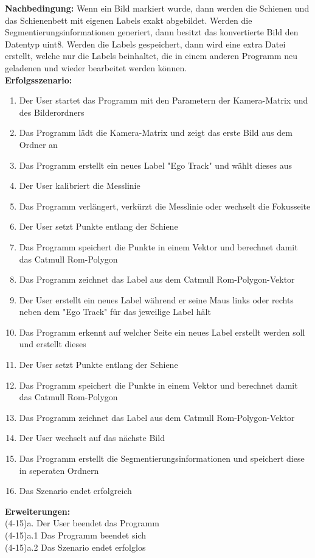 \documentclass[11pt]{scrartcl}
\begin{document}
\noindent
\textbf{Nachbedingung:} Wenn ein Bild markiert wurde, dann werden die Schienen und das Schienenbett mit eigenen Labels exakt abgebildet. Werden die Segmentierungsinformationen generiert, dann besitzt das konvertierte Bild den Datentyp uint8. Werden die Labels gespeichert, dann wird eine extra Datei erstellt, welche nur die Labels beinhaltet, die in einem anderen Programm neu geladenen und wieder bearbeitet werden können.
\\ 

\noindent
\textbf{Erfolgsszenario:}

\begin{enumerate}
	\item Der User startet das Programm mit den Parametern der Kamera-Matrix und des Bilderordners
	\item Das Programm lädt die Kamera-Matrix und zeigt das erste Bild aus dem Ordner an
	\item Das Programm erstellt ein neues Label "Ego Track" und wählt dieses aus
	\item Der User kalibriert die Messlinie
	\item Das Programm verlängert, verkürzt die Messlinie oder wechselt die Fokusseite
	\item Der User setzt Punkte entlang der Schiene
	\item Das Programm speichert die Punkte in einem Vektor und berechnet damit das Catmull Rom-Polygon
	\item Das Programm zeichnet das Label aus dem Catmull Rom-Polygon-Vektor
	\item Der User erstellt ein neues Label während er seine Maus links oder rechts neben dem "Ego Track" für das jeweilige Label hält
	\item Das Programm erkennt auf welcher Seite ein neues Label erstellt werden soll und erstellt dieses
	\item Der User setzt Punkte entlang der Schiene
	\item Das Programm speichert die Punkte in einem Vektor und berechnet damit das Catmull Rom-Polygon
	\item Das Programm zeichnet das Label aus dem Catmull Rom-Polygon-Vektor
	\item Der User wechselt auf das nächste Bild
	\item Das Programm erstellt die Segmentierungsinformationen und speichert diese in seperaten Ordnern
	\item Das Szenario endet erfolgreich
\end{enumerate}
\textbf{Erweiterungen:}
\\ 
\noindent
(4-15)a. Der User beendet das Programm
\\ 
\noindent
(4-15)a.1 Das Programm beendet sich
\\ 
\noindent
(4-15)a.2 Das Szenario endet erfolglos
\\
\end{document}
